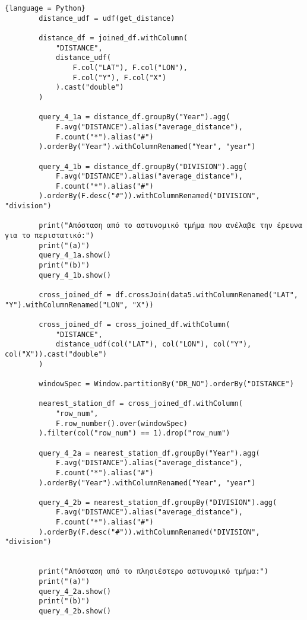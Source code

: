 \documentclass{article}
\begin{document}
\begin{lstlisting}{language = Python}
        distance_udf = udf(get_distance)

        distance_df = joined_df.withColumn(
            "DISTANCE",
            distance_udf(
                F.col("LAT"), F.col("LON"),
                F.col("Y"), F.col("X")
            ).cast("double")
        )

        query_4_1a = distance_df.groupBy("Year").agg(
            F.avg("DISTANCE").alias("average_distance"),
            F.count("*").alias("#")
        ).orderBy("Year").withColumnRenamed("Year", "year")

        query_4_1b = distance_df.groupBy("DIVISION").agg(
            F.avg("DISTANCE").alias("average_distance"),
            F.count("*").alias("#")
        ).orderBy(F.desc("#")).withColumnRenamed("DIVISION", "division")

        print("Απόσταση από το αστυνομικό τμήμα που ανέλαβε την έρευνα για το περιστατικό:")
        print("(a)")
        query_4_1a.show() 
        print("(b)")
        query_4_1b.show() 

        cross_joined_df = df.crossJoin(data5.withColumnRenamed("LAT", "Y").withColumnRenamed("LON", "X"))

        cross_joined_df = cross_joined_df.withColumn(
            "DISTANCE",
            distance_udf(col("LAT"), col("LON"), col("Y"), col("X")).cast("double")
        )

        windowSpec = Window.partitionBy("DR_NO").orderBy("DISTANCE")

        nearest_station_df = cross_joined_df.withColumn(
            "row_num",
            F.row_number().over(windowSpec)
        ).filter(col("row_num") == 1).drop("row_num")

        query_4_2a = nearest_station_df.groupBy("Year").agg(
            F.avg("DISTANCE").alias("average_distance"),
            F.count("*").alias("#")
        ).orderBy("Year").withColumnRenamed("Year", "year")

        query_4_2b = nearest_station_df.groupBy("DIVISION").agg(
            F.avg("DISTANCE").alias("average_distance"),
            F.count("*").alias("#")
        ).orderBy(F.desc("#")).withColumnRenamed("DIVISION", "division")


        print("Απόσταση από το πλησιέστερο αστυνομικό τμήμα:")
        print("(a)")
        query_4_2a.show()
        print("(b)")
        query_4_2b.show()
\end{lstlisting}

\vspace{3mm}
\end{document}

